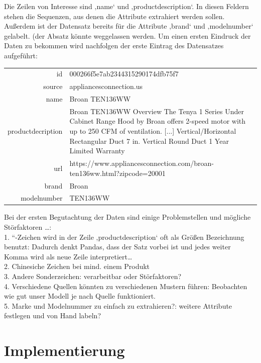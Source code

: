 \documentclass[paper=a4,12pt,listof=totoc]{scrartcl}%
\begin{document}
	Die Zeilen von Interesse sind ‚name‘ und ‚productdescription‘. In diesen Feldern stehen die Sequenzen, aus denen die Attribute extrahiert werden sollen. Außerdem ist der Datensatz bereits für die Attribute ‚brand‘ und ‚modelnumber‘ gelabelt. 
	(der Absatz könnte weggelassen werden. Um einen ersten Eindruck der Daten zu bekommen wird nachfolgen der erste Eintrag des Datensatzes aufgeführt:\\
	\begin{tabular}[h]{rl}
		id & 000266f5e7ab2344315290174dfb75f7 \\
		source & appliancesconnection.us\\
		name & Broan TEN136WW\\
		productdecription & Broan TEN136WW Overview The Tenya 1 Series Under Cabinet Range Hood by Broan offers 2-speed motor with up to 250 CFM of ventilation. [...] Vertical/Horizontal Rectangular Duct 7 in. Vertical Round Duct 1 Year Limited Warranty\\
		url & https://www.appliancesconnection.com/broan-ten136ww.html?zipcode=20001\\
		brand & Broan\\
		modelnumber & TEN136WW
	\end{tabular}
		
	Bei der ersten Begutachtung der Daten sind einige Problemstellen und mögliche Störfaktoren …:\\
		1.	“-Zeichen wird in der Zeile ‚productdescription‘ oft als Größen Bezeichnung benutzt: Dadurch denkt Pandas, dass der Satz vorbei ist und jedes weiter Komma wird als neue Zeile interpretiert…\\
		2.	Chinesiche Zeichen bei mind. einem Produkt\\
		3.	Andere Sonderzeichen: verarbeitbar oder Störfaktoren?\\
		4.	Verschiedene Quellen könnten zu verschiedenen Mustern führen: Beobachten wie gut unser Modell je nach Quelle funktioniert.\\
		5.	Marke und Modelnummer zu einfach zu extrahieren?: weitere Attribute festlegen und von Hand labeln?\\
	\section{Implementierung}
\end{document}
